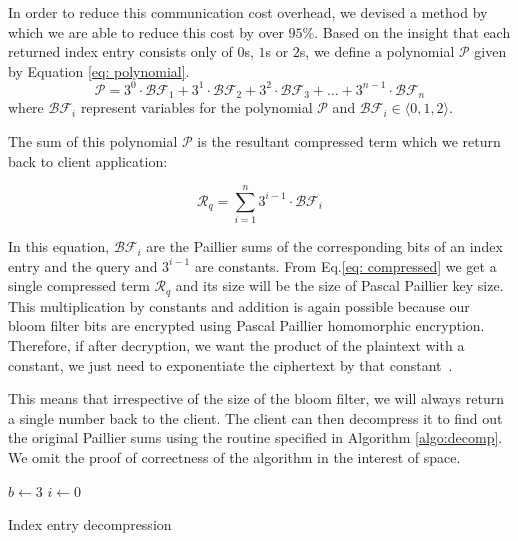 In order to reduce this communication cost overhead, we devised a method by which
we are able to reduce this cost by over $95\%$. Based on the insight that each returned
index entry consists only of $0$s, $1$s or $2$s, we
define a polynomial $\mathcal{P}$ given by Equation \ref{eq: polynomial}. 
\begin{equation}
\mathcal{P} = 3^0\cdot\mathcal{BF}_1 + 3^1\cdot\mathcal{BF}_2 +
3^2\cdot\mathcal{BF}_3 + \ldots + 3^{n-1}\cdot\mathcal{BF}_n
  \label{eq: polynomial}
\end{equation}
where $\mathcal{BF}_i$ represent variables for
the polynomial $\mathcal{P}$ and $\mathcal{BF}_i \in \langle 0,1,2 \rangle $.

The sum of this polynomial $\mathcal{P}$ is the resultant compressed term which we return back
to client application:

\begin{equation}
\mathcal{R}_q = \sum_{i=1}^{n} 3^{i-1}\cdot\mathcal{BF}_i
\label{eq: compressed}
\end{equation}

In this equation, $\mathcal{BF}_i$ are the Paillier sums of the corresponding bits
of an index entry and the
query and $3^{i-1}$ are constants. From Eq.\ref{eq:
compressed} we get a single compressed term $\mathcal{R}_q$ and its size will be
the size of Pascal Paillier key size. This multiplication by constants and addition is again possible 
because our bloom filter bits are encrypted using Pascal Paillier homomorphic
encryption. Therefore, if after decryption, we want the product of the plaintext with a constant, we
just need to exponentiate the ciphertext by that constant~\cite{pascal}.

This means that irrespective of the size
of the bloom filter,
we will always return a single number back to the client. The client can then
decompress it to find out the original Paillier sums using the routine
specified in Algorithm \ref{algo:decomp}. We omit the proof of correctness of the
algorithm in the interest of space.

\begin{algorithm}
$ b \gets 3 $ \;
$i \gets 0 $\;
\;
 \caption{Index entry decompression}
 \label{algo:decomp}
\end{algorithm}

